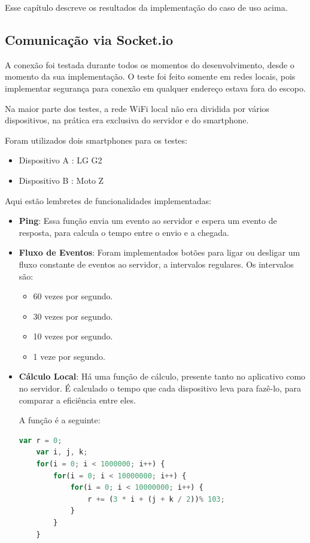 \documentclass[a4paper,12pt]{article}
\begin{document}
Esse capítulo descreve os resultados da implementação do caso de uso acima.


\subsection{Comunicação via Socket.io}

A conexão foi testada durante todos os momentos do desenvolvimento, desde o momento da sua implementação. O teste foi feito somente em redes locais, pois implementar segurança para conexão em qualquer endereço estava fora do escopo.

Na maior parte dos testes, a rede WiFi local não era dividida por vários dispositivos, na prática era exclusiva do servidor e do smartphone.

Foram utilizados dois smartphones para os testes:
\begin{itemize}
    \item Dispositivo A : LG G2
    \item Dispositivo B : Moto Z
\end{itemize}

Aqui estão lembretes de funcionalidades implementadas:

\begin{itemize}

    \item \textbf{Ping}: Essa função envia um evento ao servidor e espera um evento de resposta, para calcula o tempo entre o envio e a chegada.

    \item \textbf{Fluxo de Eventos}: Foram implementados botões para ligar ou desligar um fluxo constante de eventos ao servidor, a intervalos regulares. Os intervalos são:
    \begin{itemize}
        \item 60 vezes por segundo.
        \item 30 vezes por segundo.
        \item 10 vezes por segundo.
        \item 1 veze por segundo.
    \end{itemize}

    \item \textbf{Cálculo Local}: Há uma função de cálculo, presente tanto no aplicativo como no servidor. É calculado o tempo que cada dispositivo leva para fazê-lo, para comparar a eficiência entre eles.

    A função é a seguinte:
    \begin{lstlisting}[language=JavaScript]
    var r = 0;
    var i, j, k;
    for(i = 0; i < 1000000; i++) {
        for(i = 0; i < 10000000; i++) {
            for(i = 0; i < 10000000; i++) {
                r += (3 * i + (j + k / 2))% 103;
            }
        }
    }
    \end{lstlisting}

\end{itemize}
\end{document}
